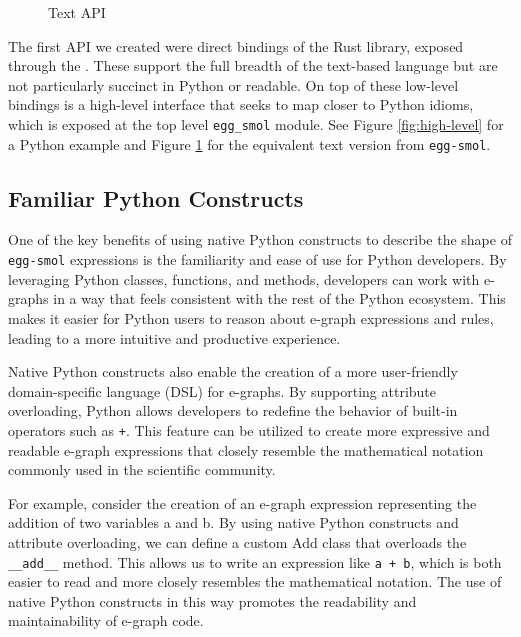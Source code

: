\documentclass[sigplan,screen,review]{acmart}
\begin{document}
\begin{figure}
   \caption{Text API}
   
   \label{fig:egg-smol}
\end{figure}



The first API we created were direct bindings of the Rust library, exposed through the . These support the full breadth of the text-based language but are not particularly succinct in Python or readable. On top of these low-level bindings is a high-level interface that seeks to map closer to Python idioms, which is exposed at the top level \verb|egg_smol| module. See Figure \ref{fig:high-level} for a Python example and Figure \ref{fig:egg-smol} for the equivalent text version from \verb|egg-smol|.

\subsection{Familiar Python Constructs}
One of the key benefits of using native Python constructs to describe the shape of \verb|egg-smol| expressions is the familiarity and ease of use for Python developers. By leveraging Python classes, functions, and methods, developers can work with e-graphs in a way that feels consistent with the rest of the Python ecosystem. This makes it easier for Python users to reason about e-graph expressions and rules, leading to a more intuitive and productive experience.

Native Python constructs also enable the creation of a more user-friendly domain-specific language (DSL) for e-graphs. By supporting attribute overloading, Python allows developers to redefine the behavior of built-in operators such as \verb|+|. This feature can be utilized to create more expressive and readable e-graph expressions that closely resemble the mathematical notation commonly used in the scientific community.

For example, consider the creation of an e-graph expression representing the addition of two variables a and b. By using native Python constructs and attribute overloading, we can define a custom Add class that overloads the \verb|__add__| method. This allows us to write an expression like \verb|a + b|, which is both easier to read and more closely resembles the mathematical notation. The use of native Python constructs in this way promotes the readability and maintainability of e-graph code.
\end{document}
